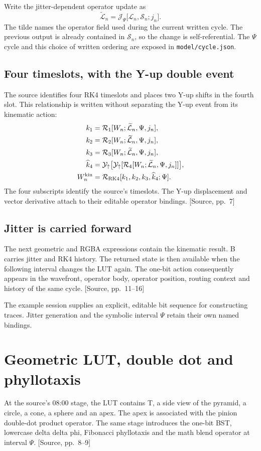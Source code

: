 \documentclass[11pt,a4paper]{article}
\newcommand{\src}[1]{{\sffamily\footnotesize\color{DWGray}[Source, pp.~#1]}}
\newcommand{\code}[1]{\texttt{#1}}
\newcommand{\LUT}{\mathcal{L}}
\newcommand{\State}{\mathcal{S}}
\begin{document}
Write the jitter-dependent operator update as
\begin{equation}
\widetilde{\LUT}_n=
\mathcal{J}_{\Psi}\bigl[\LUT_n,\State_n;j_n\bigr].
\end{equation}
The tilde names the operator field used during the current written cycle. The previous output is already contained in $\State_n$, so the change is self-referential. The $\Psi$ cycle and this choice of written ordering are exposed in \code{model/cycle.json}.

\subsection{Four timeslots, with the Y-up double event}
The source identifies four RK4 timeslots and places two Y-up shifts in the fourth slot. This relationship is written without separating the Y-up event from its kinematic action:
\begin{align}
k_1&=\mathcal{R}_1[W_n;\widetilde{\LUT}_n,\Psi,j_n],\\
k_2&=\mathcal{R}_2[W_n;\widetilde{\LUT}_n,\Psi,j_n],\\
k_3&=\mathcal{R}_3[W_n;\widetilde{\LUT}_n,\Psi,j_n],\\
\widehat{k}_4&=\mathcal{Y}_{\uparrow}
 \bigl[\mathcal{Y}_{\uparrow}[\mathcal{R}_4[W_n;\widetilde{\LUT}_n,\Psi,j_n]]\bigr],\\
W^{\rm kin}_n&=\mathcal{R}_{\rm RK4}[k_1,k_2,k_3,\widehat{k}_4;\Psi].
\end{align}
The four subscripts identify the source's timeslots. The Y-up displacement and vector derivative attach to their editable operator bindings. \src{7}

\subsection{Jitter is carried forward}
The next geometric and RGBA expressions contain the kinematic result. B carries jitter and RK4 history. The returned state is then available when the following interval changes the LUT again. The one-bit action consequently appears in the wavefront, operator body, operator position, routing context and history of the same cycle. \src{11--16}

The example session supplies an explicit, editable bit sequence for constructing traces. Jitter generation and the symbolic interval $\Psi$ retain their own named bindings.
\clearpage

\section{Geometric LUT, double dot and phyllotaxis}
At the source's 08:00 stage, the LUT contains T, a side view of the pyramid, a circle, a cone, a sphere and an apex. The apex is associated with the pinion double-dot product operator. The same stage introduces the one-bit BST, lowercase delta delta phi, Fibonacci phyllotaxis and the math blend operator at interval $\Psi$. \src{8--9}
\end{document}
